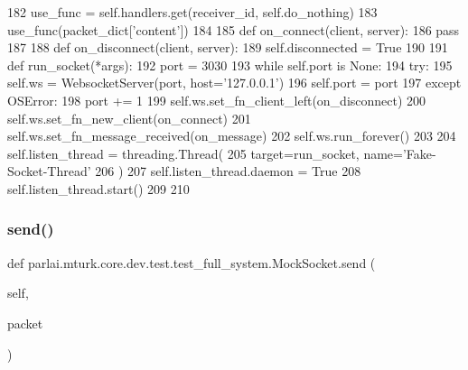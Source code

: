 \begin{DoxyCode}
182                 use\_func = self.handlers.get(receiver\_id, self.do\_nothing)
183                 use\_func(packet\_dict[\textcolor{stringliteral}{'content'}])
184 
185         \textcolor{keyword}{def }on\_connect(client, server):
186             \textcolor{keywordflow}{pass}
187 
188         \textcolor{keyword}{def }on\_disconnect(client, server):
189             self.disconnected = \textcolor{keyword}{True}
190 
191         \textcolor{keyword}{def }run\_socket(*args):
192             port = 3030
193             \textcolor{keywordflow}{while} self.port \textcolor{keywordflow}{is} \textcolor{keywordtype}{None}:
194                 \textcolor{keywordflow}{try}:
195                     self.ws = WebsocketServer(port, host=\textcolor{stringliteral}{'127.0.0.1'})
196                     self.port = port
197                 \textcolor{keywordflow}{except} OSError:
198                     port += 1
199             self.ws.set\_fn\_client\_left(on\_disconnect)
200             self.ws.set\_fn\_new\_client(on\_connect)
201             self.ws.set\_fn\_message\_received(on\_message)
202             self.ws.run\_forever()
203 
204         self.listen\_thread = threading.Thread(
205             target=run\_socket, name=\textcolor{stringliteral}{'Fake-Socket-Thread'}
206         )
207         self.listen\_thread.daemon = \textcolor{keyword}{True}
208         self.listen\_thread.start()
209 
210 
\end{DoxyCode}
\mbox{\label{classparlai_1_1mturk_1_1core_1_1dev_1_1test_1_1test__full__system_1_1MockSocket_a76c6347ad0156076cfc74a935821ce78}} 
\subsubsection{\texorpdfstring{send()}{send()}}
{\footnotesize\ttfamily def parlai.\+mturk.\+core.\+dev.\+test.\+test\+\_\+full\+\_\+system.\+Mock\+Socket.\+send (\begin{DoxyParamCaption}\item[{}]{self,  }\item[{}]{packet }\end{DoxyParamCaption})}



